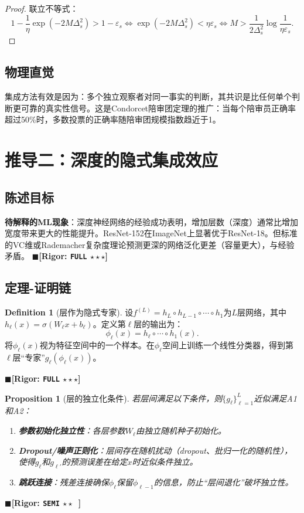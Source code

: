 \documentclass[12pt,a4paper]{ctexart}
\newtheorem{proposition}[theorem]{Proposition}
\theoremstyle{definition}
\newtheorem{definition}{Definition}[section]
\theoremstyle{remark}
\newcommand{\rigorFull}{$\blacksquare$\;\textbf{[Rigor: \texttt{FULL} $\star\star\star$]}}
\newcommand{\rigorSemi}{$\blacksquare$\;\textbf{[Rigor: \texttt{SEMI} $\star\star\;\;$]}}
\begin{document}
\begin{proof}
联立不等式：
\begin{equation}
1 - \frac{1}{\eta}\exp(-2M\Delta_s^2) > 1 - \varepsilon_s \iff \exp(-2M\Delta_s^2) < \eta\varepsilon_s \iff M > \frac{1}{2\Delta_s^2}\log\frac{1}{\eta\varepsilon_s}.
\end{equation}
\end{proof}

\subsection{物理直觉}
集成方法有效是因为：多个独立观察者对同一事实的判断，其共识是比任何单个判断更可靠的真实性信号。这是Condorcet陪审团定理的推广：当每个陪审员正确率超过50\%时，多数投票的正确率随陪审团规模指数趋近于1。

\section{推导二：深度的隐式集成效应}
\label{sec:depth}

\subsection{陈述目标}
\textbf{待解释的ML现象}：深度神经网络的经验成功表明，增加层数（深度）通常比增加宽度带来更大的性能提升。ResNet-152在ImageNet上显著优于ResNet-18。但标准的VC维或Rademacher复杂度理论预测更深的网络泛化更差（容量更大），与经验矛盾。
\rigorFull

\subsection{定理-证明链}

\begin{definition}[层作为隐式专家]
设$f^{(L)} = h_L \circ h_{L-1} \circ \cdots \circ h_1$为$L$层网络，其中$h_\ell(x) = \sigma(W_\ell x + b_\ell)$。定义第$\ell$层的输出为：
\begin{equation}
\phi_\ell(x) = h_\ell \circ \cdots \circ h_1(x).
\end{equation}
将$\phi_\ell(x)$视为特征空间中的一个样本。在$\phi_\ell$空间上训练一个线性分类器，得到第$\ell$层``专家''$g_\ell(\phi_\ell(x))$。
\end{definition}
\rigorFull

\begin{proposition}[层的独立化条件]
\label{prop:4}
若层间满足以下条件，则$\{g_\ell\}_{\ell=1}^L$近似满足A1和A2：
\begin{enumerate}[label=\arabic*.]
\item \textbf{参数初始化独立性}：各层参数$W_\ell$由独立随机种子初始化。
\item \textbf{Dropout/噪声正则化}：层间存在随机扰动（dropout、批归一化的随机性），使得$g_\ell$和$g_{\ell'}$的预测误差在给定$x$时近似条件独立。
\item \textbf{跳跃连接}：残差连接确保$\phi_\ell$保留$\phi_{\ell-1}$的信息，防止``层间退化''破坏独立性。
\end{enumerate}
\end{proposition}
\rigorSemi
\end{document}
